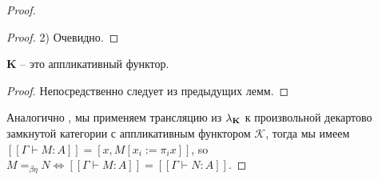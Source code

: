 \begin{proof}
\begin{proof}
\vspace{\baselineskip}

2) Очевидно.

\end{proof}

\begin{lemma}

  {\bf K} -- это аппликативный функтор.
\end{lemma}

\begin{proof}
  Непосредственно следует из предыдущих лемм.
\end{proof}

Аналогично \cite{Abramsky}, мы применяем трансляцию из $\lambda_{{\bf K}}$ к произвольной декартово замкнутой категории с аппликативным функтором $\mathcal{K}$, тогда
мы имеем $[\![\Gamma \vdash M : A]\!] = [x, M [x_i := \pi_i x]]$, so $M =_{\beta \eta} N \Leftrightarrow [\![\Gamma \vdash M : A]\!] = [\![\Gamma \vdash N : A]\!]$.

\end{proof}
